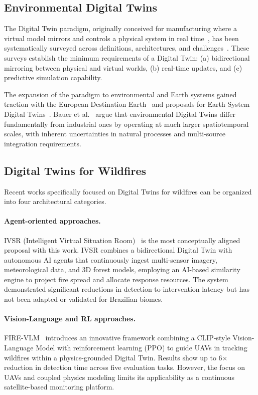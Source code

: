 \documentclass[preprint,12pt,times,numbers]{elsarticle}
\begin{document}
\subsection{Environmental Digital Twins}

The Digital Twin paradigm, originally conceived for manufacturing where a virtual model mirrors and controls a physical system in real time~\cite{article:grieves2014,article:tao2019}, has been systematically surveyed across definitions, architectures, and challenges~\cite{article:barricelli2019,article:rasheed2020,article:fuller2020,article:jones2020}. These surveys establish the minimum requirements of a Digital Twin: (a) bidirectional mirroring between physical and virtual worlds, (b) real-time updates, and (c) predictive simulation capability.

The expansion of the paradigm to environmental and Earth systems gained traction with the European Destination Earth~\cite{article:voosen2020} and proposals for Earth System Digital Twins~\cite{article:bauer2021nature,article:bauer2023natrev,article:nativi2021}. Bauer et al.~\cite{article:bauer2023natrev} argue that environmental Digital Twins differ fundamentally from industrial ones by operating at much larger spatiotemporal scales, with inherent uncertainties in natural processes and multi-source integration requirements.

\subsection{Digital Twins for Wildfires}

Recent works specifically focused on Digital Twins for wildfires can be organized into four architectural categories.

\paragraph{Agent-oriented approaches.} IVSR (Intelligent Virtual Situation Room)~\cite{article:morsali2026} is the most conceptually aligned proposal with this work. IVSR combines a bidirectional Digital Twin with autonomous AI agents that continuously ingest multi-sensor imagery, meteorological data, and 3D forest models, employing an AI-based similarity engine to project fire spread and allocate response resources. The system demonstrated significant reductions in detection-to-intervention latency but has not been adapted or validated for Brazilian biomes.

\paragraph{Vision-Language and RL approaches.} FIRE-VLM~\cite{article:webb2026} introduces an innovative framework combining a CLIP-style Vision-Language Model with reinforcement learning (PPO) to guide UAVs in tracking wildfires within a physics-grounded Digital Twin. Results show up to 6$\times$ reduction in detection time across five evaluation tasks. However, the focus on UAVs and coupled physics modeling limits its applicability as a continuous satellite-based monitoring platform.
\end{document}
